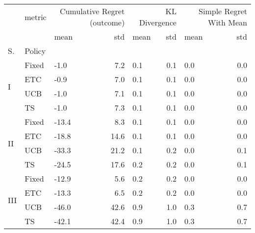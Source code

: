 \begin{tabular}{lllrlrlr}
\toprule
 & metric & \multicolumn{2}{r}{Cumulative Regret (outcome)} & \multicolumn{2}{r}{KL Divergence} & \multicolumn{2}{r}{Simple Regret With Mean} \\
 &  & mean & std & mean & std & mean & std \\
S. & Policy &  &  &  &  &  &  \\
\midrule
\multirow[c]{4}{*}{I} & Fixed & -1.0 & 7.2 & 0.1 & 0.1 & 0.0 & 0.0 \\
 & ETC & -0.9 & 7.0 & 0.1 & 0.1 & 0.0 & 0.0 \\
 & UCB & -1.0 & 7.1 & 0.1 & 0.1 & 0.0 & 0.0 \\
 & TS & -1.0 & 7.3 & 0.1 & 0.1 & 0.0 & 0.0 \\
\multirow[c]{4}{*}{II} & Fixed & -13.4 & 8.3 & 0.1 & 0.1 & 0.0 & 0.0 \\
 & ETC & -18.8 & 14.6 & 0.1 & 0.1 & 0.0 & 0.0 \\
 & UCB & -33.3 & 21.2 & 0.1 & 0.2 & 0.0 & 0.1 \\
 & TS & -24.5 & 17.6 & 0.2 & 0.2 & 0.0 & 0.1 \\
\multirow[c]{4}{*}{III} & Fixed & -12.9 & 5.6 & 0.2 & 0.2 & 0.0 & 0.0 \\
 & ETC & -13.3 & 6.5 & 0.2 & 0.2 & 0.0 & 0.0 \\
 & UCB & -46.0 & 42.6 & 0.9 & 1.0 & 0.3 & 0.7 \\
 & TS & -42.1 & 42.4 & 0.9 & 1.0 & 0.3 & 0.7 \\
\bottomrule
\end{tabular}
